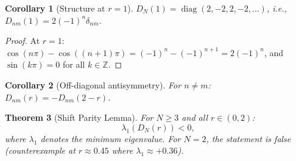 \documentclass[12pt,a4paper]{article}
\newtheorem{theorem}{Theorem}[section]
\newtheorem{corollary}[theorem]{Corollary}
\theoremstyle{definition}
\theoremstyle{remark}
\begin{document}
\begin{corollary}[Structure at $r = 1$]
\label{cor:r-one}
$D_N(1) = \operatorname{diag}(2, -2, 2, -2, \ldots)$, i.e., $D_{nm}(1) = 2(-1)^n \delta_{nm}$.
\end{corollary}

\begin{proof}
At $r = 1$: $\cos(n\pi) - \cos((n{+}1)\pi) = (-1)^n - (-1)^{n+1} = 2(-1)^n$, and $\sin(k\pi) = 0$ for all $k \in \mathbb{Z}$.
\end{proof}

\begin{corollary}[Off-diagonal antisymmetry]
\label{cor:antisym}
For $n \neq m$: $D_{nm}(r) = -D_{nm}(2-r)$.
\end{corollary}

\begin{theorem}[Shift Parity Lemma]
\label{thm:shift-parity}
For $N \geq 3$ and all $r \in (0, 2)$:
\[
  \lambda_1(D_N(r)) < 0,
\]
where $\lambda_1$ denotes the minimum eigenvalue. For $N = 2$, the statement is false (counterexample at $r \approx 0.45$ where $\lambda_1 \approx +0.36$).
\end{theorem}
\end{document}
